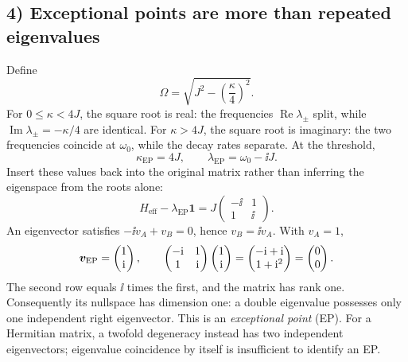 \subsection*{4) Exceptional points are more than repeated eigenvalues}
Define
\begin{equation}
\Omega=\sqrt{J^2-\left(\frac{\kappa}{4}\right)^2}.
\end{equation}
For $0\leq\kappa<4J$, the square root is real: the
frequencies $\operatorname{Re}\lambda_\pm$ split, while
$\operatorname{Im}\lambda_\pm=-\kappa/4$ are identical.
For $\kappa>4J$, the square root is imaginary: the two
frequencies coincide at $\omega_0$, while the decay rates
separate. At the threshold,
\begin{equation}
\kappa_{\mathrm{EP}}=4J,\qquad
\lambda_{\mathrm{EP}}=\omega_0-\ii J.
\label{eq:nh-ep-condition}
\end{equation}
Insert these values back into the original matrix rather than
inferring the eigenspace from the roots alone:
\begin{equation}
H_{\mathrm{eff}}-\lambda_{\mathrm{EP}}\mathbf1
=J\begin{pmatrix}-\ii&1\\1&\ii\end{pmatrix}.
\end{equation}
An eigenvector satisfies $-\ii v_A+v_B=0$, hence
$v_B=\ii v_A$. With $v_A=1$,
\begin{equation}
\bm{v}_{\mathrm{EP}}=\begin{pmatrix}1\\\mathrm{i}\end{pmatrix},\qquad
\begin{pmatrix}-\mathrm{i}&1\\1&\mathrm{i}\end{pmatrix}
\begin{pmatrix}1\\\mathrm{i}\end{pmatrix}
=\begin{pmatrix}-\mathrm{i}+\mathrm{i}\\1+\mathrm{i}^2\end{pmatrix}
=\begin{pmatrix}0\\0\end{pmatrix}.
\end{equation}
The second row equals $\ii$ times the first, and the matrix
has rank one. Consequently its nullspace has dimension one:
a double eigenvalue possesses only one independent
right eigenvector. This is an \emph{exceptional point} (EP).
For a Hermitian matrix, a twofold degeneracy instead has
two independent eigenvectors; eigenvalue coincidence by
itself is insufficient to identify an EP.

